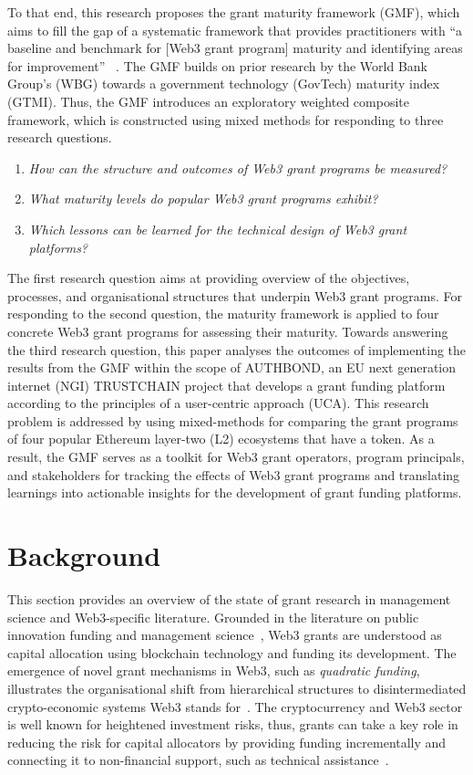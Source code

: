 \documentclass[conference]{IEEEtran}
\begin{document}
To that end, this research proposes the grant maturity framework (GMF), which aims to fill the gap of a systematic framework that provides practitioners with ``a baseline and benchmark for [Web3 grant program] maturity and identifying areas for improvement''~ \cite{dener_govtech_2021}. The GMF builds on prior research by the World Bank Group’s (WBG) towards a government technology (GovTech) maturity index (GTMI). Thus, the GMF introduces an exploratory weighted composite framework, which is constructed using mixed methods for responding to three research questions.

\small
\begin{enumerate}
\item \textit{How can the structure and outcomes of Web3 grant programs be measured?}
\item \textit{What maturity levels do popular Web3 grant programs exhibit?}
\item \textit{Which lessons can be learned for the technical design of Web3 grant platforms?}
\end{enumerate}
\normalsize

The first research question aims at providing overview of the objectives, processes, and organisational structures that underpin Web3 grant programs. For responding to the second question, the maturity framework is applied to four concrete Web3 grant programs for assessing their maturity. Towards answering the third research question, this paper analyses the outcomes of implementing the results from the GMF within the scope of  AUTHBOND, an EU next generation internet (NGI) TRUSTCHAIN project that develops a grant funding platform according to the principles of a user-centric approach (UCA). This research problem is addressed by using mixed-methods for comparing the grant programs of four popular Ethereum layer-two (L2) ecosystems that have a token. As a result, the GMF serves as a toolkit for Web3 grant operators, program principals, and stakeholders for tracking the effects of Web3 grant programs and translating learnings into actionable insights for the development of grant funding platforms.

\section{Background}\label{sec_2}

This section provides an overview of the state of grant research in management science and Web3-specific literature. Grounded in the literature on public innovation funding and management science~\cite{albors_impact_2011,bartle_review_2003}, Web3 grants are understood as capital allocation using blockchain technology and funding its development. The emergence of novel grant mechanisms in Web3, such as \textit{quadratic funding}, illustrates the organisational shift from hierarchical structures to disintermediated crypto-economic systems Web3 stands for~\cite[p.~501]{shermin_disrupting_2017}. The cryptocurrency and Web3 sector is well known for heightened investment risks, thus, grants can take a key role in reducing the risk for capital allocators by providing funding incrementally and connecting it to non-financial support, such as technical assistance~\cite[p.~6]{gilbert_sustainable_2019}.
\end{document}
